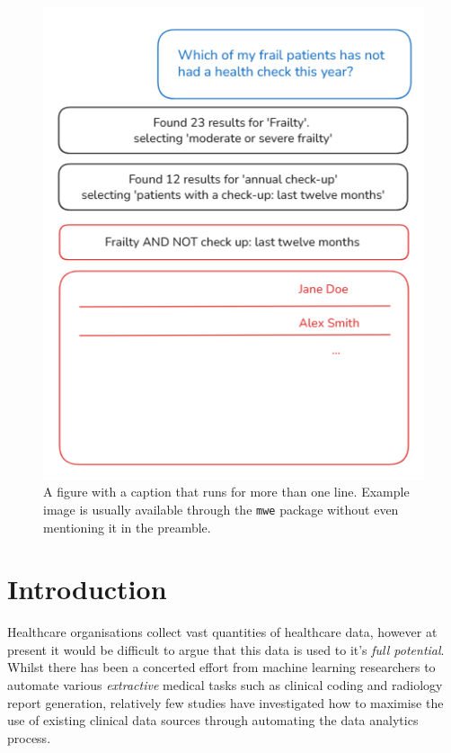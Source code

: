 \documentclass[11pt]{article}
\begin{document}
\begin{figure}[t]
  \includegraphics[width=\columnwidth]{content/chat_diagram.PNG}
  \caption{A figure with a caption that runs for more than one line.
    Example image is usually available through the \texttt{mwe} package
    without even mentioning it in the preamble.}
  \label{fig:experiments}
\end{figure}


\section{Introduction}

Healthcare organisations collect vast quantities of healthcare data, however at present it would be difficult to argue that this data is used to it's \textit{full potential}. Whilst there has been a concerted effort from machine learning researchers to automate various \textit{extractive} medical tasks such as clinical coding and radiology report generation, relatively few studies have investigated how to maximise the use of existing clinical data sources through automating the data analytics process.
\end{document}
